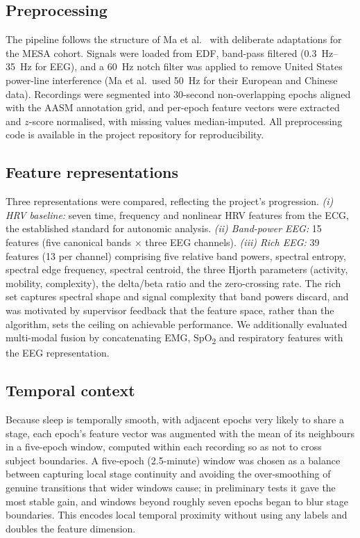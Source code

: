 \documentclass[11pt,a4paper]{article}
\begin{document}
\subsection{Preprocessing}
The pipeline follows the structure of Ma et al.~\cite{ma2026} with deliberate
adaptations for the MESA cohort. Signals were loaded from EDF, band-pass filtered
(\SIrange{0.3}{35}{\hertz} for EEG), and a \SI{60}{\hertz} notch filter was applied
to remove United States power-line interference (Ma et al.\ used \SI{50}{\hertz}
for their European and Chinese data). Recordings were segmented into 30-second
non-overlapping epochs aligned with the AASM annotation grid, and per-epoch feature
vectors were extracted and $z$-score normalised, with missing values
median-imputed. All preprocessing code is available in the project repository for
reproducibility.

\subsection{Feature representations}
Three representations were compared, reflecting the project's progression.
\emph{(i) HRV baseline:} seven time, frequency and nonlinear HRV features from the
ECG, the established standard for autonomic analysis. \emph{(ii) Band-power EEG:}
15 features (five canonical bands $\times$ three EEG channels). \emph{(iii) Rich
EEG:} 39 features (13 per channel) comprising five relative band powers, spectral
entropy, spectral edge frequency, spectral centroid, the three Hjorth parameters
(activity, mobility, complexity), the delta/beta ratio and the zero-crossing rate.
The rich set captures spectral shape and signal complexity that band powers
discard, and was motivated by supervisor feedback that the feature space, rather
than the algorithm, sets the ceiling on achievable performance. We additionally
evaluated multi-modal fusion by concatenating EMG, SpO\textsubscript{2} and
respiratory features with the EEG representation.

\subsection{Temporal context}
Because sleep is temporally smooth, with adjacent epochs very likely to share a
stage, each epoch's feature vector was augmented with the mean of its neighbours in
a five-epoch window, computed within each recording so as not to cross subject
boundaries. A five-epoch (2.5-minute) window was chosen as a balance between
capturing local stage continuity and avoiding the over-smoothing of genuine
transitions that wider windows cause; in preliminary tests it gave the most stable
gain, and windows beyond roughly seven epochs began to blur stage boundaries. This
encodes local temporal proximity without using any labels and doubles the feature
dimension.
\end{document}
